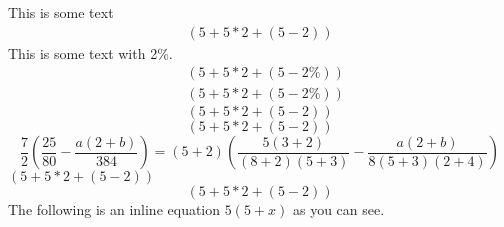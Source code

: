 \documentclass[12pt,a4paper]{article}
\begin{document}
	This is some text
	\begin{align}\label{equ1(good)}%
	(5+5*2+(5-2))%
	\end{align}
	This is some text with 2\%.
	\begin{align*}
	&(5+5*2+\left(5-2\%\right))\\
	&\left(5+5*2+\left(5-2\%\right)\right)%
	\end{align*}
	\begin{equation}\label{equ2(good)}
	(5+5*2+(5-2))%
	\end{equation}
	\begin{equation*}
	(5+5*2+(5-2))
	\end{equation*}
	\begin{equation*}
	\frac{7}{2}\left(\frac{25}{80}-\frac{a(2+b)}{384}\right) = (5+2)\left(\frac{5(3+2)}{(8+2)(5+3)}-\frac{a(2+b)}{8(5+3)(2+4)}\right)
	\end{equation*}
	\((5+5*2+(5-2))\)
	\[(5+5*2+(5-2))\]
	The following is an inline equation $5(5+x)$ as you can see.
\end{document}
